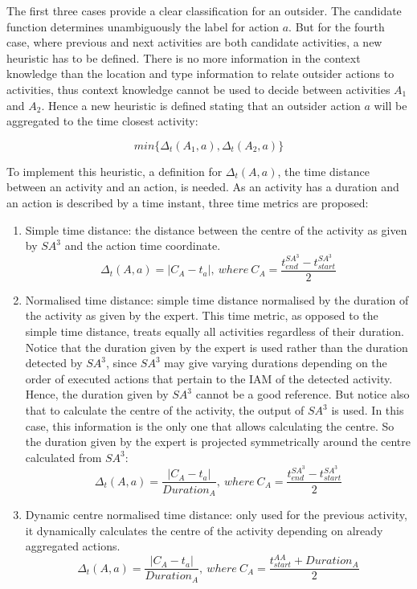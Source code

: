 The first three cases provide a clear classification for an outsider. The candidate function determines unambiguously the label for action $a$. But for the fourth case, where previous and next activities are both candidate activities, a new heuristic has to be defined. There is no more information in the context knowledge than the location and type information to relate outsider actions to activities, thus context knowledge cannot be used to decide between activities $A_1$ and $A_2$. Hence a new heuristic is defined stating that an outsider action $a$ will be aggregated to the time closest activity:

\begin{equation}
 min\{\Delta_t(A_1, a), \Delta_t(A_2, a)\}
\end{equation}

To implement this heuristic, a definition for $\Delta_t(A, a)$, the time distance between an activity and an action, is needed. As an activity has a duration and an action is described by a time instant, three time metrics are proposed:

\begin{enumerate}
 \item Simple time distance: the distance between the centre of the activity as given by $SA^3$ and the action time coordinate.
 \begin{equation}
 \label{eq-t1}
  \Delta_t(A, a) = | C_A - t_a |,\ where \ C_A = \frac{t_{end} ^{SA^3} - t_{start} ^{SA^3}}{2}
 \end{equation}
 \item Normalised time distance: simple time distance normalised by the duration of the activity as given by the expert. This time metric, as opposed to the simple time distance, treats equally all activities regardless of their duration. Notice that the duration given by the expert is used rather than the duration detected by $SA^3$, since $SA^3$ may give varying durations depending on the order of executed actions that pertain to the IAM of the detected activity. Hence, the duration given by $SA^3$ cannot be a good reference. But notice also that to calculate the centre of the activity, the output of $SA^3$ is used. In this case, this information is the only one that allows calculating the centre. So the duration given by the expert is projected symmetrically around the centre calculated from $SA^3$:
 \begin{equation}
 \label{eq-t2}
  \Delta_t(A, a) = \frac{| C_A - t_a |}{Duration_A} ,\ where \ C_A = \frac{t_{end} ^{SA^3} - t_{start} ^{SA^3}}{2}
 \end{equation}
 \item Dynamic centre normalised time distance: only used for the previous activity, it dynamically calculates the centre of the activity depending on already aggregated actions.
 \begin{equation}
 \label{eq-t3}
  \Delta_t(A, a) = \frac{| C_A - t_a |}{Duration_A} ,\ where \ C_A = \frac{t_{start} ^{AA} + Duration_A}{2}
 \end{equation}
\end{enumerate}

